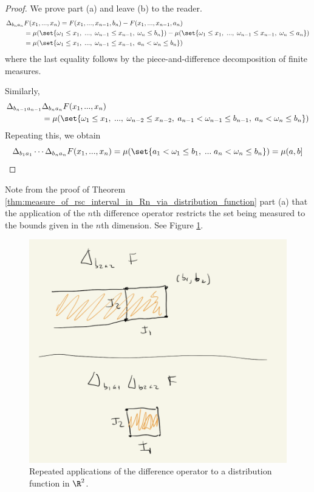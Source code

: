 \documentclass{article} %
\begin{document}
\begin{proof}
We prove part (a) and leave (b) to the reader.
\begin{align*}
\Delta_{b_na_n} &F(x_1, ..., x_n) = 	F(x_1,...,x_{n-1}, b_n) - F(x_1,...,x_{n-1}, a_n)\\
&=\mu(\set{\omega_1 \leq x_1, \; ..., \; \omega_{n-1} \leq x_{n-1}, \; \omega_{n} \leq b_{n}}) - \mu(\set{\omega_1 \leq x_1, \; ..., \; \omega_{n-1} \leq x_{n-1}, \;\omega_{n} \leq a_{n}}) \\
&=\mu(\set{\omega_1 \leq x_1, \; ..., \; \omega_{n-1} \leq x_{n-1}, \; a_n < \omega_{n} \leq b_{n}})
\end{align*}
where the last equality follows by the piece-and-difference decomposition of finite measures.

Similarly, 
\begin{align*}
\Delta_{b_{n-1}a_{n-1}} &\Delta_{b_na_n} F(x_1, ..., x_n) \\
&=\mu(\set{\omega_1 \leq x_1, \;..., \; \omega_{n-2} \leq x_{n-2}, \; a_{n-1} < \omega_{n-1} \leq b_{n-1}, \; a_n < \omega_{n} \leq b_{n}})
\end{align*}
Repeating this, we obtain
\[\Delta_{b_1a_1} \cdots \Delta_{b_na_n} F(x_1, ..., x_n) =  \mu(\set{a_1 < \omega_1 \leq b_1, \; ... \; a_n < \omega_{n} \leq b_{n}}) = \mu(a,b]\]

\end{proof}

\begin{remark}
Note from the proof of Theorem \ref{thm:measure_of_rsc_interval_in_Rn_via_distribution_function} part (a) that the application of the $n$th difference operator restricts the set being measured to the bounds given in the $n$th dimension.  See Figure \ref{fig:applying_the_difference_operator_to_distribution_functions_in_R2}.

\begin{figure}[H]
\centering
\includegraphics[width=.5\textwidth]{images/applying_the_difference_operator_to_distribution_functions_in_R2}	
\caption{Repeated applications of the difference operator to a distribution function in $\R^2$.}
\label{fig:applying_the_difference_operator_to_distribution_functions_in_R2}
\end{figure}


\end{remark}
\end{document}
